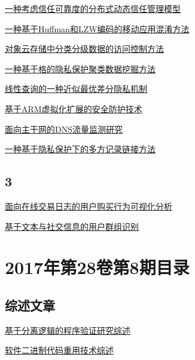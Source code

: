 \documentclass[a4paper]{article}
\begin{document}
\href{http://www.jos.org.cn/ch/reader/create_pdf.aspx?file_no=5180&year_id=2017&quarter_id=9&falg=1}{一种考虑信任可靠度的分布式动态信任管理模型}

\href{http://www.jos.org.cn/ch/reader/create_pdf.aspx?file_no=5181&year_id=2017&quarter_id=9&falg=1}{一种基于Huffman和LZW编码的移动应用混淆方法}

\href{http://www.jos.org.cn/ch/reader/create_pdf.aspx?file_no=5182&year_id=2017&quarter_id=9&falg=1}{对象云存储中分类分级数据的访问控制方法}

\href{http://www.jos.org.cn/ch/reader/create_pdf.aspx?file_no=5183&year_id=2017&quarter_id=9&falg=1}{一种基于格的隐私保护聚类数据挖掘方法}

\href{http://www.jos.org.cn/ch/reader/create_pdf.aspx?file_no=5184&year_id=2017&quarter_id=9&falg=1}{线性查询的一种近似最优差分隐私机制}

\href{http://www.jos.org.cn/ch/reader/create_pdf.aspx?file_no=5185&year_id=2017&quarter_id=9&falg=1}{基于ARM虚拟化扩展的安全防护技术}

\href{http://www.jos.org.cn/ch/reader/create_pdf.aspx?file_no=5186&year_id=2017&quarter_id=9&falg=1}{面向主干网的DNS流量监测研究}

\href{http://www.jos.org.cn/ch/reader/create_pdf.aspx?file_no=5187&year_id=2017&quarter_id=9&falg=1}{一种基于隐私保护下的多方记录链接方法}

\subsection{3}
\href{http://www.jos.org.cn/ch/reader/create_pdf.aspx?file_no=5266&year_id=2017&quarter_id=9&falg=1}{面向在线交易日志的用户购买行为可视化分析}

\href{http://www.jos.org.cn/ch/reader/create_pdf.aspx?file_no=5267&year_id=2017&quarter_id=9&falg=1}{基于文本与社交信息的用户群组识别}


\section{\textbf{2017年第28卷第8期目录}}
\subsection{综述文章}
\href{http://www.jos.org.cn/ch/reader/create_pdf.aspx?file_no=5272&year_id=2017&quarter_id=8&falg=1}{基于分离逻辑的程序验证研究综述}

\href{http://www.jos.org.cn/ch/reader/create_pdf.aspx?file_no=5270&year_id=2017&quarter_id=8&falg=1}{软件二进制代码重用技术综述}
\end{document}
